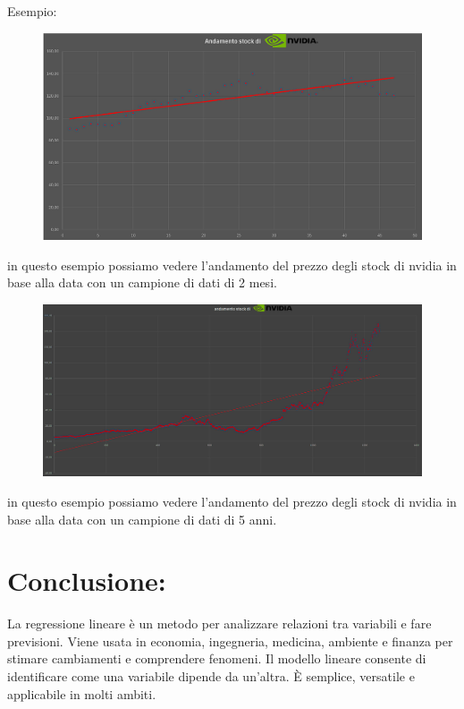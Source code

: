 \documentclass[12pt]{article}
\begin{document}
\begin{center}
    Esempio:

\begin{figure}[ht]
    \centering
    \includegraphics[width=\textwidth]{immagini/Screenshot 2024-11-20 000800.png}
\end{figure}
in questo esempio possiamo vedere l'andamento del prezzo degli stock di nvidia in base alla data con un campione di dati di 2 mesi.
\begin{figure}[ht]
    \centering
    \includegraphics[width=\textwidth]{immagini/Screenshot 2024-11-20 210756.png}
\end{figure}
in questo esempio possiamo vedere l'andamento del prezzo degli stock di nvidia in base alla data con un campione di dati di 5 anni.
\end{center}
\section*{Conclusione:}
La regressione lineare è un metodo per analizzare relazioni tra variabili e fare previsioni. Viene usata in economia, ingegneria, medicina, ambiente e finanza 
per stimare cambiamenti e comprendere fenomeni. Il modello lineare consente di identificare come una variabile dipende da un'altra. È semplice, versatile e applicabile 
in molti ambiti.
\end{document}
